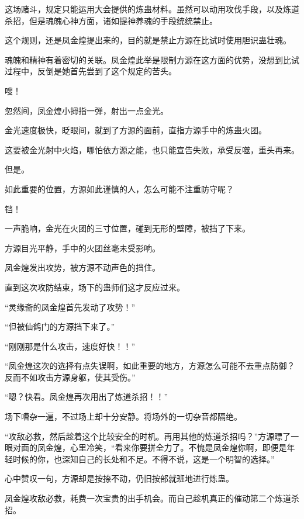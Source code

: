 
\begin{this_body}

这场赌斗，规定只能运用大会提供的炼蛊材料。虽然可以动用攻伐手段，以及炼道杀招，但是魂魄心神方面，诸如提神养魂的手段统统禁止。

这个规则，还是凤金煌提出来的，目的就是禁止方源在比试时使用胆识蛊壮魂。

魂魄和精神有着密切的关联。凤金煌此举是限制方源在这方面的优势，没想到比试过程中，反倒是她首先尝到了这个规定的苦头。

嗖！

忽然间，凤金煌小拇指一弹，射出一点金光。

金光速度极快，眨眼间，就到了方源的面前，直指方源手中的炼蛊火团。

这要被金光射中火焰，哪怕依方源之能，也只能宣告失败，承受反噬，重头再来。

但是。

如此重要的位置，方源如此谨慎的人，怎么可能不注重防守呢？

铛！

一声脆响，金光在火团的三寸位置，碰到无形的壁障，被挡了下来。

方源目光平静，手中的火团丝毫未受影响。

凤金煌发出攻势，被方源不动声色的挡住。

直到这次攻防结束，场下的蛊师们这才反应过来。

“灵缘斋的凤金煌首先发动了攻势！”

“但被仙鹤门的方源挡下来了。”

“刚刚那是什么攻击，速度好快！！”

“凤金煌这次的选择有点失误啊，如此重要的地方，方源怎么可能不去重点防御？反而不如攻击方源身躯，使其受伤。”

“嗯？快看。凤金煌再次用出了炼道杀招！！”

场下嘈杂一遍，不过场上却十分安静。将场外的一切杂音都隔绝。

“攻敌必救，然后趁着这个比较安全的时机。再用其他的炼道杀招吗？”方源瞟了一眼对面的凤金煌，心里冷笑，“看来你要拼全力了。不愧是凤金煌你啊，即便是年轻时候的你，也深知自己的长处和不足。不得不说，这是一个明智的选择。”

心中赞叹一句，方源却是按捺不动，仍旧按部就班地进行炼蛊。

凤金煌攻敌必救，耗费一次宝贵的出手机会。而自己趁机真正的催动第二个炼道杀招。


\end{this_body}
